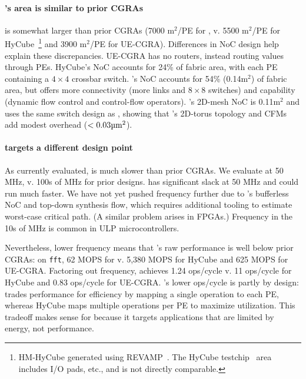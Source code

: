 \paragraph{\riptide's area is similar to prior CGRAs}
\riptide is somewhat larger than prior CGRAs
(7000 \textmu m$^2$/PE for \riptide, v.
5500 \textmu m$^2$/PE for HyCube~\cite{revamp}\footnote{HM-HyCube generated using REVAMP~\cite{revamp}. The HyCube testchip~\cite{wang2019hycube} area includes I/O pads, etc., and is not directly comparable.}
and 3900 \textmu m$^2$/PE for UE-CGRA).
% 
Differences in NoC design help explain these discrepancies.
%
UE-CGRA has no routers, instead routing values through PEs.
%
% 
HyCube's NoC accounts for 24\% of fabric area, with each PE containing a $4\times4$ crossbar switch.
% 
\riptide's NoC accounts for 54\% (0.14\textmu m$^2$) of fabric area, but offers more connectivity (more links and $8\times8$ switches) and capability (dynamic flow control and control-flow operators).
%
\snafu's 2D-mesh NoC is 0.11\textmu m$^2$ and uses the same switch design as \riptide, showing that \riptide's 2D-torus topology and CFMs add modest overhead ($<0.03\text{\textmu m}^2$).

\paragraph{\riptide targets a different design point}
As currently evaluated, \riptide is much slower than prior CGRAs.
%
We evaluate \riptide at 50 MHz,
v. 100s of MHz for prior designs.
%
\riptide has significant slack at 50 MHz
and could run much faster.
%
We have not yet pushed frequency further
due to \riptide's bufferless NoC
and top-down synthesis flow,
which requires additional tooling to
estimate worst-case critical path.
(A similar problem arises in FPGAs.)
%
Frequency in the 10s of MHz is
common in ULP microcontrollers.

Nevertheless, lower frequency means that \riptide's raw performance is well below prior CGRAs:
%
on {\tt fft}, 62 MOPS for \riptide v. 5,380 MOPS for HyCube
and 625 MOPS for UE-CGRA.
%
Factoring out frequency, \riptide achieves 1.24 ops/cycle
v. 11 ops/cycle for HyCube
and 0.83 ops/cycle for UE-CGRA.
%
\riptide's lower ops/cycle is partly by design:
\riptide trades performance for efficiency by mapping a single operation to each PE,
whereas HyCube maps multiple operations per PE to maximize utilization.
%
This tradeoff makes sense for \riptide
because it targets applications
that are limited by energy, not performance.

